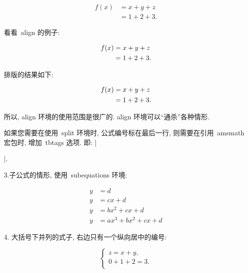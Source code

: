 \documentclass{whuBSthesis}%
\begin{document}
\begin{SideBySideExample}[xrightmargin=8cm,frame=single ]
  \begin{equation}
  \begin{split}
    f(x) &= x+y+z\\
         &= 1+2+3.
  \end{split}
  \end{equation}
\end{SideBySideExample}


看看~align 的例子:
\begin{everbatim}
\begin{align}
   f(x)&=x+y+z \notag\\
       &=1+2+3.
\end{align}
\end{everbatim}
排版的结果如下:
\begin{colorboxed}[width=\linewidth]
\begin{align}
   f(x)&=x+y+z \notag\\
       &=1+2+3.
\end{align}
\end{colorboxed}
所以, align 环境的使用范围是很广的. align 环境可以``通杀''各种情形.

如果您需要在使用~split 环境时, 公式编号标在最后一行, 则需要在引用~amsmath 宏包时,
增加~tbtags 选项. 即: \everb|\usepackage[tbtags]{amsmath}|.

3.子公式的情形, 使用~subequations 环境:

\begin{SideBySideExample}[xrightmargin=8cm,frame=single ]
  \begin{subequations}
  \begin{align}
  y & = d\\
  y & = cx+d\\
  y & = bx ^{2}+ cx+d\\
  y & = ax ^{3}+ bx ^{2}+ cx+d
  \end{align}
  \end{subequations}
\end{SideBySideExample}


4. 大括号下并列的式子, 右边只有一个纵向居中的编号:

\begin{SideBySideExample}[xrightmargin=8cm,frame=single ]
  \begin{equation}\label{eq:array}
  \left\{
   \begin{array}{c}
           z = x + y,  \\
   0 + 1 + 2 = 3.  \\
   \end{array}
  \right.
  \end{equation}
\end{SideBySideExample}
\end{document}
